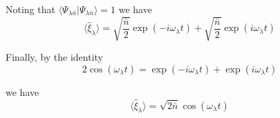 Noting that $\langle\Psi_{\lambda\bar n}|\Psi_{\lambda\bar n}\rangle=1$ we have
\begin{equation*}
\langle\hat\xi_\lambda\rangle
=\sqrt{\frac{\bar n}{2}}\exp(-i\omega_\lambda t)+\sqrt{\frac{\bar n}{2}}\exp(i\omega_\lambda t)
\end{equation*}

Finally, by the identity
\begin{equation*}
2\cos(\omega_\lambda t)=\exp(-i\omega_\lambda t)+\exp(i\omega_\lambda t)
\end{equation*}

we have
\begin{equation*}
\langle\hat\xi_\lambda\rangle=\sqrt{2\bar n}\cos(\omega_\lambda t)
\end{equation*}


